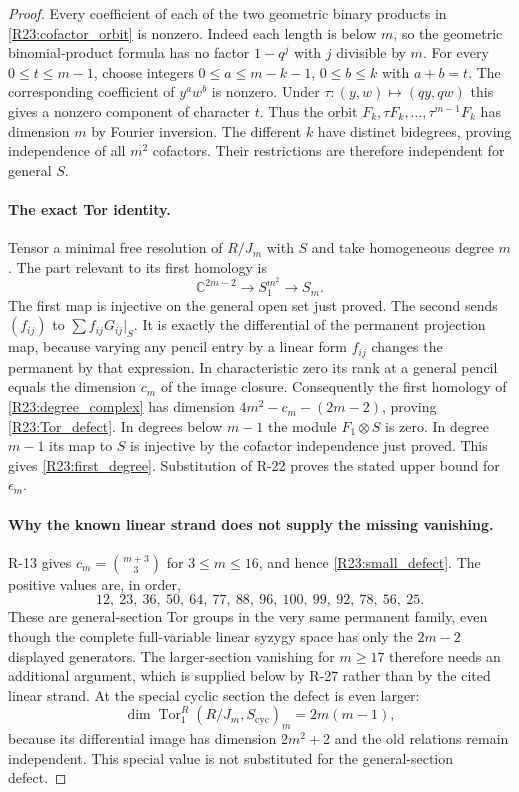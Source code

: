 \begin{proof}
Every coefficient of each of the two geometric binary products in
\eqref{R23:cofactor_orbit} is nonzero. Indeed each length is below
$m$, so the geometric binomial-product formula has no factor
$1-q^j$ with $j$ divisible by $m$. For every
$0\leq t\leq m-1$, choose integers
$0\leq a\leq m-k-1$, $0\leq b\leq k$ with $a+b=t$.
The corresponding coefficient of $y^aw^b$ is nonzero. Under
$\tau:(y,w)\mapsto(qy,qw)$ this gives a nonzero component of
character $t$. Thus the orbit
$F_k,\tau F_k,\ldots,\tau^{m-1}F_k$ has dimension $m$ by Fourier
inversion. The different $k$ have distinct bidegrees, proving
independence of all $m^2$ cofactors. Their restrictions are therefore
independent for general $S$.

\paragraph{The exact Tor identity.}
Tensor a minimal free resolution of $R/J_m$ with $S$ and take
homogeneous degree $m$. The part relevant to its first homology is
\begin{equation}\label{R23:degree_complex}
 \mathbb C^{2m-2}\longrightarrow
                 S_1^{m^2}\longrightarrow S_m.
\end{equation}
The first map is injective on the general open set just proved.
The second sends $(f_{ij})$ to
$\sum f_{ij}G_{ij}|_S$. It is exactly the differential of the
permanent projection map, because varying any pencil entry by a
linear form $f_{ij}$ changes the permanent by that expression.
In characteristic zero its rank at a general pencil equals the
dimension $c_m$ of the image closure. Consequently the first
homology of \eqref{R23:degree_complex} has dimension
$4m^2-c_m-(2m-2)$, proving \eqref{R23:Tor_defect}.
In degrees below $m-1$ the module $F_1\otimes S$ is zero. In degree
$m-1$ its map to $S$ is injective by the cofactor independence just
proved. This gives \eqref{R23:first_degree}.
Substitution of R-22 proves the stated upper bound for $\epsilon_m$.

\paragraph{Why the known linear strand does not supply the missing vanishing.}
R-13 gives $c_m=\binom{m+3}{3}$ for $3\leq m\leq16$,
and hence \eqref{R23:small_defect}. The positive values are, in order,
\[
 12,\ 23,\ 36,\ 50,\ 64,\ 77,\ 88,\ 96,\ 100,\ 99,\ 92,\ 78,\ 56,\ 25.
\]
These are general-section Tor groups in the very same permanent
family, even though the complete full-variable linear syzygy space
has only the $2m-2$ displayed generators. The larger-section
vanishing for $m\geq17$ therefore needs an additional argument,
which is supplied below by R-27 rather than by the cited linear strand.
At the special cyclic section the defect is even larger:
\[
 \dim\operatorname{Tor}_1^R(R/J_m,S_{\mathrm{cyc}})_m
 =2m(m-1),
\]
because its differential image has dimension $2m^2+2$ and the old
relations remain independent. This special value is not substituted
for the general-section defect.


\end{proof}
